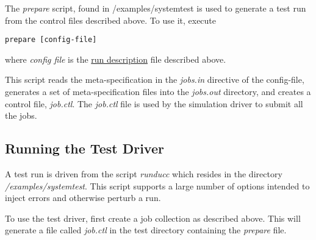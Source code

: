      The {\em prepare} script, found in \duccruntime/examples/systemtest is used
     to generate a test run from the control files described above.
     To use it, execute
\begin{verbatim}
prepare [config-file]
\end{verbatim}
     where {\em config file} is the \hyperref[subsec:simulation.run-description]{run description} file
     described above.

     This script reads the meta-specification in the {\em jobs.in} directive of the
     config-file, generates a set of meta-specification files into the {\em jobs.out}
     directory, and creates a control file, {\em job.ctl}.  The {\em job.ctl} file is used
     by the simulation driver to submit all the jobs.
     

\subsection{Running the Test Driver}
    A test run is driven from the script {\em runducc} which resides in the 
    directory {\em \duccruntime/examples/systemtest}. This
    script supports a large number of options intended to inject errors and otherwise
    perturb a run.

    To use the test driver, first create a job collection as described above.  This will
    generate a file called {\em job.ctl} in the test directory containing the {\em prepare}
    file.

